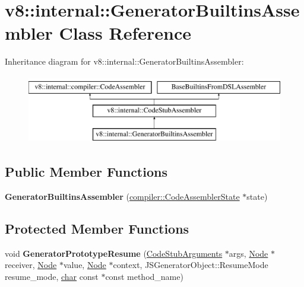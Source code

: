 \hypertarget{classv8_1_1internal_1_1GeneratorBuiltinsAssembler}{}\section{v8\+:\+:internal\+:\+:Generator\+Builtins\+Assembler Class Reference}
\label{classv8_1_1internal_1_1GeneratorBuiltinsAssembler}
Inheritance diagram for v8\+:\+:internal\+:\+:Generator\+Builtins\+Assembler\+:\begin{figure}[H]
\begin{center}
\leavevmode
\includegraphics[height=3.000000cm]{classv8_1_1internal_1_1GeneratorBuiltinsAssembler}
\end{center}
\end{figure}
\subsection*{Public Member Functions}
\begin{DoxyCompactItemize}
\item 
\mbox{\label{classv8_1_1internal_1_1GeneratorBuiltinsAssembler_a87e793ac752ba7d4a0956c7d53d84588}} 
{\bfseries Generator\+Builtins\+Assembler} (\mbox{\hyperlink{classv8_1_1internal_1_1compiler_1_1CodeAssemblerState}{compiler\+::\+Code\+Assembler\+State}} $\ast$state)
\end{DoxyCompactItemize}
\subsection*{Protected Member Functions}
\begin{DoxyCompactItemize}
\item 
\mbox{\label{classv8_1_1internal_1_1GeneratorBuiltinsAssembler_a46c30969cc44ff2f462bf64d47b5f107}} 
void {\bfseries Generator\+Prototype\+Resume} (\mbox{\hyperlink{classv8_1_1internal_1_1CodeStubArguments}{Code\+Stub\+Arguments}} $\ast$args, \mbox{\hyperlink{classv8_1_1internal_1_1compiler_1_1Node}{Node}} $\ast$receiver, \mbox{\hyperlink{classv8_1_1internal_1_1compiler_1_1Node}{Node}} $\ast$value, \mbox{\hyperlink{classv8_1_1internal_1_1compiler_1_1Node}{Node}} $\ast$context, J\+S\+Generator\+Object\+::\+Resume\+Mode resume\+\_\+mode, \mbox{\hyperlink{classchar}{char}} const $\ast$const method\+\_\+name)
\end{DoxyCompactItemize}
